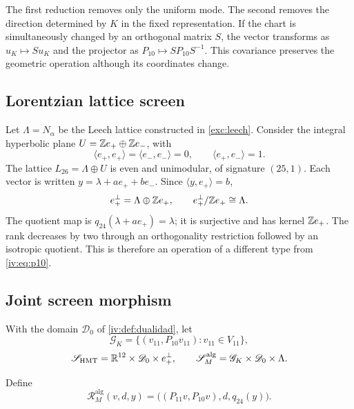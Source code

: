The first reduction removes only the uniform mode.
The second removes the direction determined by \(K\) in
the fixed representation. If the chart is simultaneously changed
by an orthogonal matrix \(S\), the vector transforms as
\(u_K\mapsto Su_K\) and the projector as
\(P_{10}\mapsto SP_{10}S^{-1}\). This covariance preserves
the geometric operation although its coordinates change.

\subsection{Lorentzian lattice screen}

Let \(\Lambda=N_\alpha\) be the Leech lattice constructed
in \ref{exc:leech}. Consider the integral hyperbolic plane
\(U=\mathbb Z e_+\oplus\mathbb Z e_-\), with
\[
 \langle e_+,e_+\rangle=\langle e_-,e_-\rangle=0,
 \qquad\langle e_+,e_-\rangle=1.
\]
The lattice \(L_{26}=\Lambda\oplus U\) is even and
unimodular, of signature \((25,1)\). Each vector is written
\(y=\lambda+ae_++be_-\). Since
\(\langle y,e_+\rangle=b\),
\begin{equation}
 e_+^\perp=\Lambda\oplus\mathbb Z e_+,
 \qquad e_+^\perp/\mathbb Z e_+\cong\Lambda.
 \label{iv:eq:26-24}
\end{equation}
The quotient map is
\(q_{24}(\lambda+ae_+)=\lambda\); it is surjective and has
kernel \(\mathbb Z e_+\). The rank decreases by two through
an orthogonality restriction followed by an isotropic
quotient. This is therefore an operation of a different type from
\eqref{iv:eq:p10}.

\subsection{Joint screen morphism}

With the domain \(\mathscr D_0\) of \ref{iv:def:dualidad},
let
\[
 \mathscr G_K=\{(v_{11},P_{10}v_{11}):v_{11}\in V_{11}\},
\]
\[
 \mathscr S_{\mathrm{HMT}}=\mathbb R^{12}\times\mathscr D_0\times e_+^\perp,
 \qquad
 \mathscr S_M^{\mathrm{alg}}=\mathscr G_K\times\mathscr D_0\times\Lambda.
\]
\begin{definition}
\label{iv:def:rm-alg}
Define
\begin{equation}
 \mathcal R_M^{\mathrm{alg}}(v,d,y)
 =\bigl((P_{11}v,P_{10}v),d,q_{24}(y)\bigr).
 \label{iv:eq:rm-alg}
\end{equation}
\end{definition}

